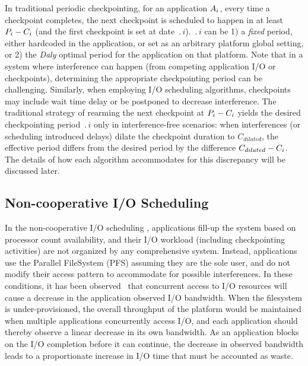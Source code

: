 In traditional periodic checkpointing, for an application $A_{i}$,
every time a checkpoint completes, the next checkpoint is scheduled to
happen in at least $P_{i}-C_{i}$ (and the first checkpoint is
set at date $\period{i}$). $\period{i}$ can be 1) a \emph{fixed} period,
either hardcoded in the application, or set as an arbitrary platform
global setting, or 2) the \emph{Daly} optimal period for the
application on that platform. Note that in a system where interference
can happen (from competing application I/O or checkpoints), determining
the appropriate checkpointing period can be challenging.
Similarly, when employing I/O scheduling algorithms,
checkpoints may include wait time delay or be postponed to decrease
interference. The traditional strategy of rearming the next checkpoint at
$P_{i}-C_{i}$ yields the desired checkpointing period $\period{i}$
only in interference-free scenarios: when interferences (or scheduling
introduced delays) dilate the checkpoint duration to $C_{dilated}$, the effective
period differs from the desired period by the difference $C_{dilated}-C_{i}$.
The details of how each algorithm accommodates for this discrepancy will
be discussed later.


\subsection{Non-cooperative \nocoop I/O Scheduling}

In the non-cooperative I/O scheduling \nocoop, applications
fill-up the system based on processor count availability, and their I/O
workload (including checkpointing activities) are not organized by any
comprehensive system. Instead, applications use the Parallel FileSystem (PFS) assuming they
are the sole user, and do not modify their access pattern to accommodate
for possible interferences. In these conditions, it has been observed~\cite{Dorier2014}
that concurrent access
to I/O resources will cause a decrease in the application observed
I/O bandwidth.
When the filesystem is under-provisioned, the overall throughput of the platform
would be maintained when multiple applications concurrently access I/O, and each
application should thereby observe a linear decrease in its own bandwidth. As an
application blocks on the I/O completion before it can continue, the decrease in
observed bandwidth leads to a proportionate increase in I/O time that must be
accounted as waste.

